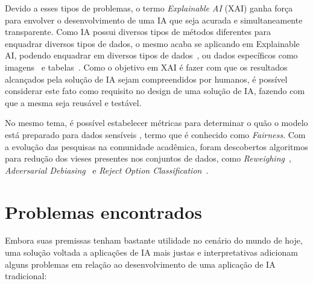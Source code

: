 \documentclass[portugues]{ic-tese}
\begin{document}
Devido a esses tipos de problemas, o termo \textit{Explainable AI} (XAI) ganha força para envolver o desenvolvimento de uma IA que seja acurada e simultaneamente transparente. Como IA possui diversos tipos de métodos diferentes para enquadrar diversos tipos de dados, o mesmo acaba se aplicando em Explainable AI, podendo enquadrar em diversos tipos de dados~\citep{Sundararajan_2017}, ou dados específicos como imagens~\citep{Kapishnikov_2019} e tabelas~\citep{Maleki_2013}. Como o objetivo em XAI é fazer com que os resultados alcançados pela solução de IA sejam compreendidos por humanos, é possível considerar este fato como requisito no design de uma solução de IA, fazendo com que a mesma seja reusável e testável.

No mesmo tema, é possível estabelecer métricas para determinar o quão o modelo está preparado para dados sensíveis \citep{Begley_2021}, termo que é conhecido como \textit{Fairness}. Com a evolução das pesquisas na comunidade acadêmica, foram descobertos algoritmos para redução dos vieses presentes nos conjuntos de dados, como \textit{Reweighing}~\citep{Kamiran_2011}, \textit{Adversarial Debiasing}~\citep{Zhang_2018} e \textit{Reject Option Classification}~\citep{Kamiran_2012}.

\section{Problemas encontrados}

Embora suas premissas tenham bastante utilidade no cenário do mundo de hoje, uma solução voltada a aplicações de IA mais justas e interpretativas adicionam alguns problemas em relação ao desenvolvimento de uma aplicação de IA tradicional:
\end{document}
